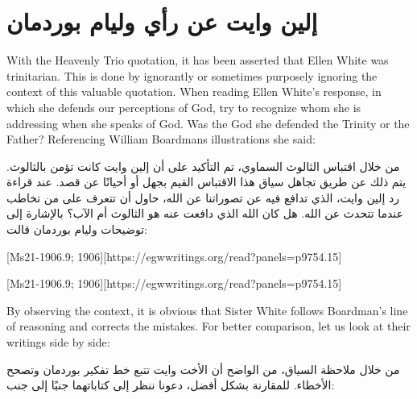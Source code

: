 \section*{إلين وايت عن رأي وليام بوردمان}


With the Heavenly Trio quotation, it has been asserted that Ellen White was trinitarian. This is done by ignorantly or sometimes purposely ignoring the context of this valuable quotation. When reading Ellen White’s response, in which she defends our perceptions of God, try to recognize whom she is addressing when she speaks of God. Was the God she defended the Trinity or the Father? Referencing William Boardmans illustrations she said:


من خلال اقتباس الثالوث السماوي، تم التأكيد على أن إلين وايت كانت تؤمن بالثالوث. يتم ذلك عن طريق تجاهل سياق هذا الاقتباس القيم بجهل أو أحيانًا عن قصد. عند قراءة رد إلين وايت، الذي تدافع فيه عن تصوراتنا عن الله، حاول أن تتعرف على من تخاطب عندما تتحدث عن الله. هل كان الله الذي دافعت عنه هو الثالوث أم الآب؟ بالإشارة إلى توضيحات وليام بوردمان قالت:


[Ms21-1906.9; 1906][https://egwwritings.org/read?panels=p9754.15]


[Ms21-1906.9; 1906][https://egwwritings.org/read?panels=p9754.15]


By observing the context, it is obvious that Sister White follows Boardman’s line of reasoning and corrects the mistakes. For better comparison, let us look at their writings side by side:


من خلال ملاحظة السياق، من الواضح أن الأخت وايت تتبع خط تفكير بوردمان وتصحح الأخطاء. للمقارنة بشكل أفضل، دعونا ننظر إلى كتاباتهما جنبًا إلى جنب:


